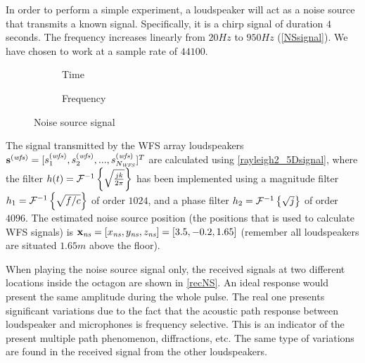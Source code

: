 In order to perform a simple experiment, a loudspeaker will act as a noise source that transmits a known signal. Specifically, it is a chirp signal of duration $4$ seconds. The frequency increases linearly from $20 \si{Hz}$ to $950\si{Hz}$ (\autoref{NSsignal}). We have chosen to work at a sample rate of $44100$.
\begin{figure}[h]
	\begin{subfigure}[b]{0.49\textwidth}
	\centering
	\def\svgwidth{0.9\columnwidth}
	\graphicspath{{Img/}}
	{\fontsize{5}{12}\selectfont
		
	}
	\caption{Time}
	\end{subfigure}
	\begin{subfigure}[b]{0.49\textwidth}
	\centering
	\def\svgwidth{0.9\columnwidth}
	\graphicspath{{Img/}}
	{\fontsize{5}{12}\selectfont
		
	}
	\caption{Frequency}
\end{subfigure}
	\caption{Noise source signal}
	\label{NSsignal}
\end{figure}

The signal transmitted by the WFS array loudspeakers $\vec{\signal[wfs][time]} = [\signal[wfs][time]_1, \signal[wfs][time]_2, ..., \signal[wfs][time]_{\numWFS}]^T$ are calculated using \autoref{rayleigh2_5Dsignal}, where the filter $\freqFilter(t) = \FourierTransform{\sqrt{\frac{jk}{2\pi}}}[inverse]$ has been implemented using a magnitude filter $\freqFilter[time][magnitude] = \FourierTransform{\sqrt{f/c}}[inverse]$ of order $1024$, and a phase filter $\freqFilter[time][phase] = \FourierTransform{\sqrt{j}}[inverse]$ of order $4096$. The estimated noise source position (the positions that is used to calculate WFS signals) is $\Position[ns] = [\Position[ns][x], \Position[ns][y], \Position[ns][z]] = [3.5, -0.2, 1.65]$ (remember all loudspeakers are situated $1.65\si{m}$ above the floor).

When playing the noise source signal only, the received signals at two different locations inside the octagon are shown in \autoref{recNS}. An ideal response would present the same amplitude during the whole pulse. The real one presents significant variations due to the fact that the acoustic path response between loudspeaker and microphones is frequency selective. This is an indicator of the present multiple path phenomenon, diffractions, etc. The same type of variations are found in the received signal from the other loudspeakers. %

